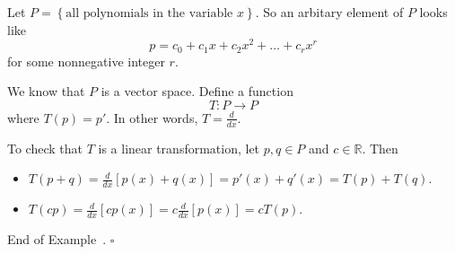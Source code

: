 \documentclass[10pt]{article}
\theoremstyle{definition}
\newtheorem{example}[theorem]{Example}
\renewenvironment{example}
{\begin{oldexample}}
  {\par\smallskip\hfill   End of Example~\theexample. $\square$    \par\end{oldexample}}
\newcommand{\R}{\mathbb{R}}           %
\begin{document}
\begin{example}
  \label{ex:derivative-is-a-linear-transformation}
  Let $P= \left\{ \text{all polynomials in the variable }x\right\}$. So an
  arbitary element of $P$ looks like
  \begin{equation*}
    p = c_{0}+c_{1}x+c_{2}x^{2}+\ldots+c_{r}x^{r}
  \end{equation*}
  for some nonnegative integer $r$.
  
  We know that $P$ is a vector space. Define a function
  \begin{equation*}
    T: P \to P
  \end{equation*}
  where $T(p) = p'$. In other words, $T= \frac{d}{dx}$.

  To check that $T$ is a linear transformation, let $p,q\in P$ and $c\in \R$. Then
  \begin{itemize}
    \item $T(p+q) = \frac{d}{dx}\left[ p(x)+q(x) \right]= p'(x)+q'(x) =
    T(p)+ T(q)$. 
    \item $T(cp)= \frac{d}{dx}\left[ cp(x) \right]= c \frac{d}{dx} \left[ p(x)
    \right] = c T(p)$.
  \end{itemize}
\end{example}
\end{document}
